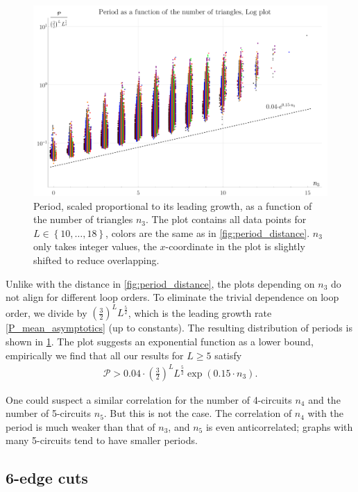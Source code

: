 \documentclass[11pt,a4paper]{article}
\newcommand{\period}{\mathcal P}
\renewcommand{\|}{\rule[-0.4ex]{0.2ex}{1.2em}}
\begin{document}
\begin{figure}[htb]
	\centering
	\includegraphics[width=.9\linewidth]{period_triangles.png}
	\caption{Period, scaled proportional to its leading growth, as a function of the number of triangles $n_3$. The plot contains all data points for $L \in \left \lbrace 10, \ldots, 18 \right \rbrace $, colors are the same as in \cref{fig:period_distance}. $n_3$ only takes integer values, the $x$-coordinate in the plot is slightly shifted to reduce overlapping.  }
	\label{fig:period_triangles}
\end{figure}


Unlike with the distance in \cref{fig:period_distance}, the plots depending on $n_3$ do not align for different loop orders. To eliminate the trivial dependence on loop order, we divide by $\left( \frac 32 \right) ^L L^{\frac 52}$, which is the leading growth rate \cref{P_mean_asymptotics} (up to constants). The resulting distribution of periods is shown in \cref{fig:period_triangles}. The plot suggests an exponential function as a lower bound, empirically we find that all our results for $L \geq 5$ satisfy
\begin{align}\label{period_triangle_bound}
\period > 0.04 \cdot  \left( \frac 32 \right) ^L L^{\frac 52} \exp \left(  0.15 \cdot n_3 \right)  .
\end{align}


One could suspect a similar correlation for the number of 4-circuits $n_4$ and the number of 5-circuits $n_5$. But this is not the case. The correlation of $n_4$ with the period is much weaker than that of $n_3$, and $n_5$ is even anticorrelated; graphs with many 5-circuits tend to have smaller periods. 



\subsection{6-edge cuts}\label{sec:relations_6cuts}
\end{document}
